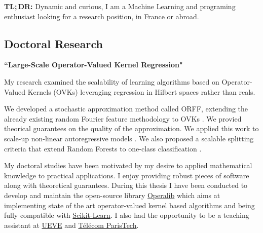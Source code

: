 \documentclass[10pt]{article} %
\begin{document}
\begin{center}
    \textbf{TL;\,DR:} Dynamic and curious, I am a Machine Learning and
    programing enthusiast looking for a research position, in France or abroad.
\end{center}
\medskip
\begin{paracol}{2}
%
%
\section{Doctoral Research}
%
{\raggedright\textbf{``Large-Scale Operator-Valued Kernel
                       Regression"} \citep{braul2017}\\\medskip}
%
My research examined the scalability of learning algorithms based on
Operator-Valued Kernels (OVKs) leveraging regression in Hilbert spaces rather
than reals. \par
\hspace*{5pt} We developed a stochastic approximation method called ORFF,
extending the already existing random Fourier feature methodology to OVKs
\citep{pmlr-v63-Brault39}. We provied theorical guarantees on the quality of
the approximation. We applied this work to scale-up non-linear autoregressive
models \citep{brault2016scaling}. We also proposed a scalable splitting
criteria that extend Random Forests to one-class classification
\citep{pmlr-v77-goix17a}. \par
\hspace*{5pt}
My doctoral studies have been motivated by my desire to applied mathematical
knowledge to practical applications. I enjoy providing robust pieces of
software along with theoretical guarantees. During this thesis I have been
conducted to develop and maintain the open-source library
\href{https://github.com/operalib/operalib}{Operalib} which aims at
implementing state of the art operator-valued kernel based algorithms and being
fully compatible with
\href{http://scikit-learn.org/stable/index.html}{Scikit-Learn}. I also had the
opportunity to be a teaching assistant at
\href{https://www.univ-evry.fr/accueil.html}{UEVE} and
\href{https://www.telecom-paristech.fr/}{T\'el\'ecom ParisTech}.
%
\medskip %
%
%

\end{paracol}
\end{document}
